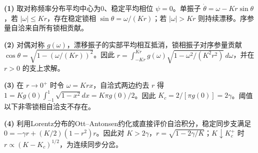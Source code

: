 \par\noindent\textbf{(1)} 取对称频率分布平均中心为0、稳定平均相位 \(\psi=0\)。单振子 \(\dot\theta=\omega-Kr\sin\theta\)，若 \(|\omega|\le Kr\)，存在稳定锁相 \(\sin\theta=\omega/(Kr)\)；若 \(|\omega|>Kr\) 则持续漂移。序参量自洽来自所有锁相贡献。
\par\noindent\textbf{(2)} 对偶对称 \(g(\omega)\)，漂移振子的实部平均相互抵消，锁相振子对序参量贡献 \(\cos\theta=\sqrt{1-(\omega/(Kr))^2}\)。因此 \(r=\int_{-Kr}^{Kr}g(\omega)\sqrt{1-\omega^2/(K^2r^2)}\,d\omega\)，并在 \(r>0\) 的支上求解。
\par\noindent\textbf{(3)} 在 \(r\to0^+\) 时令 \(\omega=Krx\)，自洽式两边约去 \(r\) 得 \(1=K g(0)\int_{-1}^1\sqrt{1-x^2}dx=K\pi g(0)/2\)。因此 \(K_c=2/[\pi g(0)]=2\gamma\)。阈值以下非零锁相自洽支不存在。
\par\noindent\textbf{(4)} 利用Lorentz分布的Ott–Antonsen约化或直接评价自洽积分，稳定同步支满足 \(0=-\gamma r+(K/2)(1-r^2)r\)。因此对 \(K>2\gamma\)，\(r=\sqrt{1-2\gamma/K}\)；\(K\downarrow K_c^+\) 时 \(r\propto(K-K_c)^{1/2}\)，为连续同步分岔。
